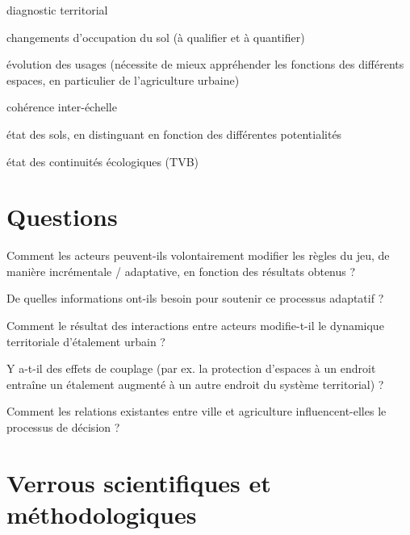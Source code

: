 \stopitemize
\stopcolumns

\subject{Critères d'évaluation}

\startitemize[packed]

\item diagnostic territorial
\item changements d'occupation du sol (à qualifier et à quantifier)
\item évolution des usages (nécessite de mieux appréhender les fonctions
  des différents espaces, en particulier de l'agriculture urbaine)
\item cohérence inter-échelle
\item état des sols, en distinguant en fonction
  des différentes potentialités
\item état des continuités écologiques (TVB)

\stopitemize


\page[yes]

\section{Questions}

\startitemize[n]

\item 	Comment les acteurs peuvent-ils
	volontairement modifier les règles du jeu,
	de manière incrémentale / adaptative,
	en fonction des résultats obtenus ?
	
	De quelles informations ont-ils besoin
	pour soutenir ce processus adaptatif ?

\item	Comment le résultat des interactions
	entre acteurs modifie-t-il le dynamique territoriale
	d'étalement urbain ?
	
	Y a-t-il des effets de couplage (par ex. la protection d'espaces à un endroit
	entraîne un étalement augmenté à un autre endroit du système territorial) ?

\item	Comment les relations existantes entre ville et agriculture
	influencent-elles le processus de décision ?

\stopitemize

\section{Verrous scientifiques et méthodologiques}

